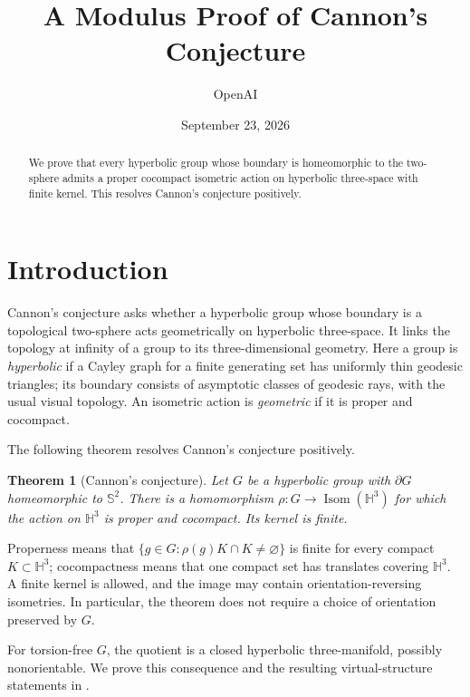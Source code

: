\documentclass[11pt]{article}
\title{A Modulus Proof of Cannon's Conjecture}
\author{OpenAI}
\date{September 23, 2026}
\numberwithin{equation}{section}
\newtheorem{theorem}{Theorem}[section]
\theoremstyle{definition}
\theoremstyle{remark}
\newcommand{\HH}{\mathbb H}
\newcommand{\Sphere}{\mathbb S^2}
\DeclareMathOperator{\Isom}{Isom}
\begin{document}
\maketitle
\begin{abstract}
We prove that every hyperbolic group whose boundary is homeomorphic to
the two-sphere admits a proper cocompact isometric action on hyperbolic
three-space with finite kernel. This resolves Cannon's conjecture
positively.
\end{abstract}

\setcounter{tocdepth}{1}
\tableofcontents
\newpage

\section{Introduction}
\label{sec:introduction}

Cannon's conjecture asks whether a hyperbolic group whose boundary is a
topological two-sphere acts geometrically on hyperbolic three-space.
It links the topology at infinity of a group to its three-dimensional
geometry. Here a group is \emph{hyperbolic} if a Cayley graph for a
finite generating set has uniformly thin geodesic triangles; its boundary
consists of asymptotic classes of geodesic rays, with the usual visual
topology. An isometric action is \emph{geometric} if it is proper and
cocompact.

The following theorem resolves Cannon's conjecture positively.

\begin{theorem}[Cannon's conjecture]
\label{thm:main}
Let $G$ be a hyperbolic group with $\partial G$ homeomorphic to $\Sphere$.
There is a homomorphism $\rho:G\to\Isom(\HH^3)$ for which the action
on $\HH^3$ is proper and cocompact. Its kernel is finite.
\end{theorem}

Properness means that $\{g\in G:\rho(g)K\cap K\ne\varnothing\}$ is
finite for every compact $K\subset\HH^3$; cocompactness means that one
compact set has translates covering $\HH^3$. A finite kernel is allowed, and the image may contain orientation-reversing
isometries. In particular, the theorem does not require a choice of
orientation preserved by $G$.

For torsion-free $G$, the quotient is a closed hyperbolic
three-manifold, possibly nonorientable. We prove this consequence and
the resulting virtual-structure statements in .
\end{document}
